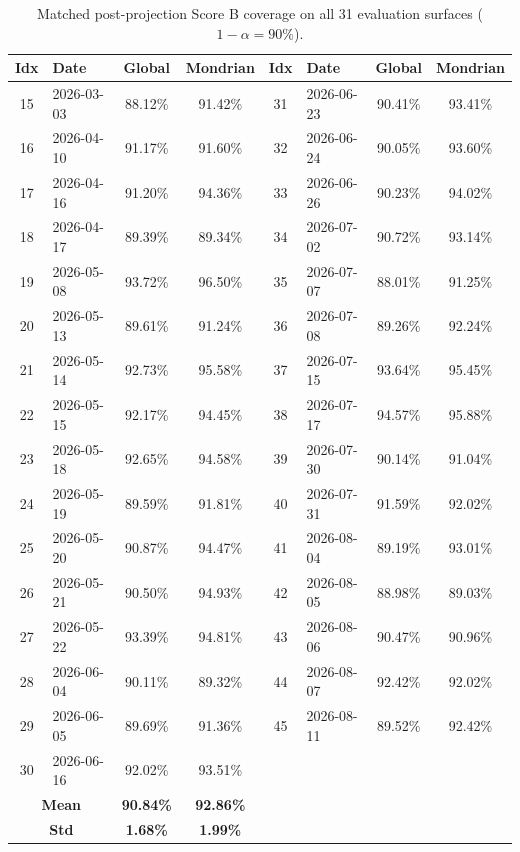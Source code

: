 \begin{table}[H]
\centering
\small
\begin{tabular}{|c|l|c|c||c|l|c|c|}
\hline
\textbf{Idx} & \textbf{Date} & \textbf{Global} & \textbf{Mondrian} &
\textbf{Idx} & \textbf{Date} & \textbf{Global} & \textbf{Mondrian} \\
\hline
15 & 2026-03-03 & 88.12\% & 91.42\% & 31 & 2026-06-23 & 90.41\% & 93.41\% \\
16 & 2026-04-10 & 91.17\% & 91.60\% & 32 & 2026-06-24 & 90.05\% & 93.60\% \\
17 & 2026-04-16 & 91.20\% & 94.36\% & 33 & 2026-06-26 & 90.23\% & 94.02\% \\
18 & 2026-04-17 & 89.39\% & 89.34\% & 34 & 2026-07-02 & 90.72\% & 93.14\% \\
19 & 2026-05-08 & 93.72\% & 96.50\% & 35 & 2026-07-07 & 88.01\% & 91.25\% \\
20 & 2026-05-13 & 89.61\% & 91.24\% & 36 & 2026-07-08 & 89.26\% & 92.24\% \\
21 & 2026-05-14 & 92.73\% & 95.58\% & 37 & 2026-07-15 & 93.64\% & 95.45\% \\
22 & 2026-05-15 & 92.17\% & 94.45\% & 38 & 2026-07-17 & 94.57\% & 95.88\% \\
23 & 2026-05-18 & 92.65\% & 94.58\% & 39 & 2026-07-30 & 90.14\% & 91.04\% \\
24 & 2026-05-19 & 89.59\% & 91.81\% & 40 & 2026-07-31 & 91.59\% & 92.02\% \\
25 & 2026-05-20 & 90.87\% & 94.47\% & 41 & 2026-08-04 & 89.19\% & 93.01\% \\
26 & 2026-05-21 & 90.50\% & 94.93\% & 42 & 2026-08-05 & 88.98\% & 89.03\% \\
27 & 2026-05-22 & 93.39\% & 94.81\% & 43 & 2026-08-06 & 90.47\% & 90.96\% \\
28 & 2026-06-04 & 90.11\% & 89.32\% & 44 & 2026-08-07 & 92.42\% & 92.02\% \\
29 & 2026-06-05 & 89.69\% & 91.36\% & 45 & 2026-08-11 & 89.52\% & 92.42\% \\
30 & 2026-06-16 & 92.02\% & 93.51\% & & & & \\
\hline
\multicolumn{2}{|c|}{\textbf{Mean}} & \textbf{90.84\%} & \textbf{92.86\%} & & & & \\
\multicolumn{2}{|c|}{\textbf{Std}} & \textbf{1.68\%} & \textbf{1.99\%} & & & & \\
\hline
\end{tabular}
\caption{Matched post-projection Score B coverage on all 31 evaluation surfaces ($1-\alpha=90\%$).}
\label{tab:coverage_scoreb}
\end{table}

